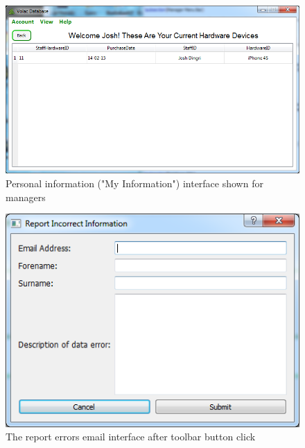 \begin{figure}[H]
    \includegraphics[width=\textwidth]{./Maintenance/Images/myinfomanager.png}
    \caption{Personal information ("My Information") interface shown for managers} \label{fig:myinfomanager}
\end{figure}

\begin{figure}[H]
    \includegraphics[width=\textwidth]{./Maintenance/Images/ReportError.png}
    \caption{The report errors email interface after toolbar button click} \label{fig:ReportError}
\end{figure}

